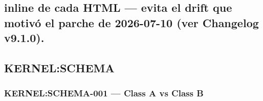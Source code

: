 \documentclass[
]{article}
\begin{document}
\subsection{inline de cada HTML --- evita el drift que motivó el parche
de 2026-07-10 (ver Changelog
v9.1.0).}\label{inline-de-cada-html-evita-el-drift-que-motivuxf3-el-parche-de-2026-07-10-ver-changelog-v9.1.0.}

\subsection{KERNEL:SCHEMA}\label{kernelschema}

\subsubsection{KERNEL:SCHEMA-001 --- Class A vs Class
B}\label{kernelschema-001-class-a-vs-class-b}
\end{document}
